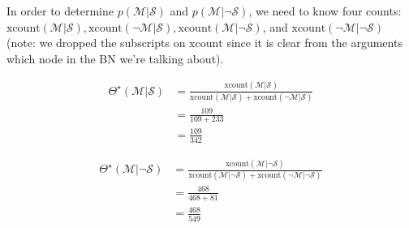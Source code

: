 \documentclass[review_Solutions]{subfiles}
\begin{document}
\item In order to determine $p(\mathcal{M} | \mathcal{S})$ and $p(\mathcal{M}|\neg \mathcal{S})$, we need to know four counts: $\mbox{xcount}(\mathcal{M}| \mathcal{S}), \mbox{xcount}(\neg \mathcal{M}| \mathcal{S}), \mbox{xcount}(\mathcal{M}|\neg \mathcal{S})$, and $\mbox{xcount}(\neg \mathcal{M}|\neg \mathcal{S})$ (note: we dropped the subscripts on $\mbox{xcount}$ since it is clear from the arguments which node in the BN we're talking about).

\begin{align}
\Theta^\star(\mathcal{M}|  \mathcal{S}) &= \frac{\mbox{xcount}(\mathcal{M}| \mathcal{S})}{\mbox{xcount}(\mathcal{M}| \mathcal{S}) + \mbox{xcount}(\neg \mathcal{M}|  \mathcal{S}) } \nonumber \\
&= \frac{109}{109+233} \nonumber \\
&= \frac{109}{342} \nonumber
\end{align}

\begin{align}
\Theta^\star(\mathcal{M}| \neg \mathcal{S}) &= \frac{\mbox{xcount}(\mathcal{M}| \neg \mathcal{S})}{\mbox{xcount}(\mathcal{M}| \neg \mathcal{S}) + \mbox{xcount}(\neg \mathcal{M}| \neg \mathcal{S}) } \nonumber \\
&= \frac{468}{468+81} \nonumber \\
&= \frac{468}{549} \nonumber
\end{align}
\end{document}
